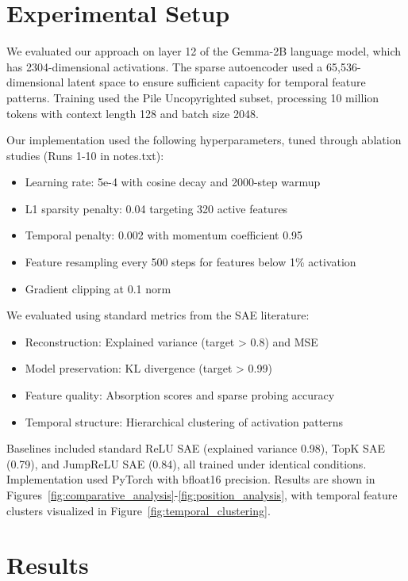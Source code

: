 \documentclass{article} %
\begin{document}
\section{Experimental Setup}
\label{sec:experimental}

We evaluated our approach on layer 12 of the Gemma-2B language model, which has 2304-dimensional activations. The sparse autoencoder used a 65,536-dimensional latent space to ensure sufficient capacity for temporal feature patterns. Training used the Pile Uncopyrighted subset, processing 10 million tokens with context length 128 and batch size 2048.

Our implementation used the following hyperparameters, tuned through ablation studies (Runs 1-10 in notes.txt):
\begin{itemize}
    \item Learning rate: 5e-4 with cosine decay and 2000-step warmup
    \item L1 sparsity penalty: 0.04 targeting 320 active features
    \item Temporal penalty: 0.002 with momentum coefficient 0.95
    \item Feature resampling every 500 steps for features below 1\% activation
    \item Gradient clipping at 0.1 norm
\end{itemize}

We evaluated using standard metrics from the SAE literature:
\begin{itemize}
    \item Reconstruction: Explained variance (target > 0.8) and MSE
    \item Model preservation: KL divergence (target > 0.99)
    \item Feature quality: Absorption scores and sparse probing accuracy
    \item Temporal structure: Hierarchical clustering of activation patterns
\end{itemize}

Baselines included standard ReLU SAE (explained variance 0.98), TopK SAE (0.79), and JumpReLU SAE (0.84), all trained under identical conditions. Implementation used PyTorch with bfloat16 precision. Results are shown in Figures~\ref{fig:comparative_analysis}-\ref{fig:position_analysis}, with temporal feature clusters visualized in Figure~\ref{fig:temporal_clustering}.

\section{Results}
\label{sec:results}
\end{document}
